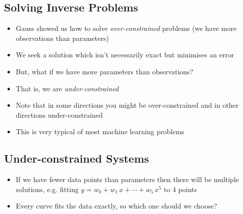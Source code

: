 \begin{slide}
\section{Solving Inverse Problems}

\begin{PauseHighLight}
  \begin{itemize}
  \item Gauss showed us how to solve \emph{over-constrained} problems
    (we have more observations than parameters)\pause
  \item We seek a solution which isn't necessarily exact but minimises
    an error\pause
  \item But, what if we have more parameters than observations?\pause
  \item That is, we are \emph{under-constrained}\pause
  \item Note that in some directions you might be over-constrained and
    in other directions under-constrained\pause
  \item This is very typical of most machine learning problems\pauseb
  \end{itemize}
\end{PauseHighLight}

\end{slide}


\begin{slide}
\section[-2]{Under-constrained Systems}

\pb
  \begin{itemize}\squeeze
  \item If we have fewer data points than parameters then there will be
    multiple solutions, e.g.{} fitting
    $y = w_0 + w_1\,x + \cdots + w_5\,x^5$ to 4 points\pauseh
    \begin{center}
      \pause
    \end{center}
  \item Every curve fits the data exactly, so which one should we
    choose?\pause
  \end{itemize}

\end{slide}



